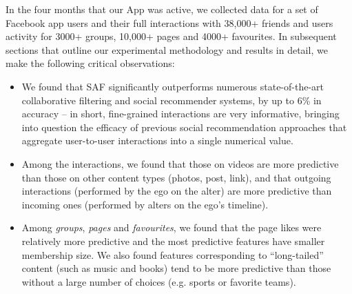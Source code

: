 In the four months that our App was active, we collected data for a set of 
Facebook app users and their full interactions with 38,000+ friends
and users activity for 3000+ groups, 10,000+ pages and 4000+ favourites. 
In subsequent sections that outline our experimental methodology and results in detail, 
we make the following critical observations:
\begin{itemize}
\item We found that SAF significantly 
outperforms numerous state-of-the-art collaborative filtering and social recommender 
systems, by up to 6\% in accuracy -- in short, fine-grained 
interactions are very informative, bringing into question the efficacy of 
previous social recommendation approaches that aggregate user-to-user interactions into 
a single numerical value.


\item Among the interactions, we found that those on videos are more predictive than those on other content types (photos, post, link), and that outgoing interactions (performed by the ego on the alter) 
are more predictive than incoming ones (performed by alters on the ego's timeline).
\item %
Among {\em groups}, {\em pages} and {\em favourites}, we found that the page likes were
relatively more predictive and the most predictive features have smaller membership size. 
We also found features corresponding to ``long-tailed'' content (such as music and books)
tend to be more predictive than those without a large number of choices 
(e.g. sports or favorite teams). 
\end{itemize}

